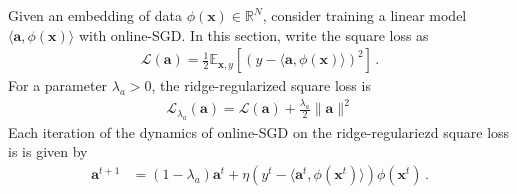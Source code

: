\documentclass[11pt]{article}
\newcommand{\E}{\mathbb{E}}
\newcommand{\R}{\mathbb{R}}
\newcommand{\<}{\langle}
\renewcommand{\>}{\rangle}
\theoremstyle{definition}
\def\ba{{\boldsymbol a}}
\def\bx{{\boldsymbol x}}
\def\cL{{\mathcal L}}
\def\bx{{\boldsymbol x}}
\def\ba{{\boldsymbol a}}
\begin{document}
Given an embedding of data $\phi(\bx) \in \R^N$, consider training a linear model $\<\ba, \phi(\bx)\>$ with online-SGD. In this section, write the square loss as
\begin{align*}
\cL(\ba) = \frac{1}{2}\E_{\bx,y}[(y - \<\ba,\phi(\bx)\>)^2]\,.
\end{align*}
For a parameter $\lambda_a > 0$, the ridge-regularized square loss is 
\begin{align*}
\cL_{\lambda_a}(\ba) = \cL(\ba) + \frac{\lambda_a}{2} \|\ba\|^2
\end{align*}
Each iteration of the dynamics of online-SGD on the ridge-regulariezd square loss is is given by
\begin{align*}
\ba^{t+1} &= (1 - \lambda_a) \ba^t + \eta (y^t - \<\ba^t, \phi(\bx^t)\>) \phi(\bx^t)\,.
\end{align*}
\end{document}
